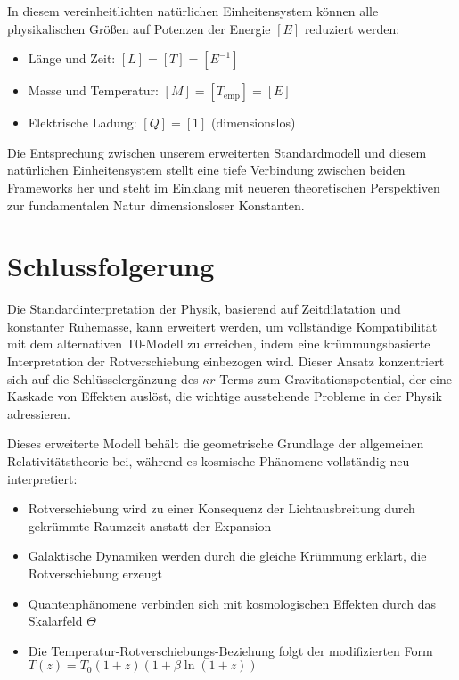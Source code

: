 \documentclass[12pt,a4paper]{article}
\begin{document}
	In diesem vereinheitlichten natürlichen Einheitensystem können alle physikalischen Größen auf Potenzen der Energie $[E]$ reduziert werden\cite{pascher_alpha_2025}:
	\begin{itemize}
		\item Länge und Zeit: $[L] = [T] = [E^{-1}]$
		\item Masse und Temperatur: $[M] = [T_{\text{emp}}] = [E]$
		\item Elektrische Ladung: $[Q] = [1]$ (dimensionslos)
	\end{itemize}
	
	Die Entsprechung zwischen unserem erweiterten Standardmodell und diesem natürlichen Einheitensystem stellt eine tiefe Verbindung zwischen beiden Frameworks her und steht im Einklang mit neueren theoretischen Perspektiven zur fundamentalen Natur dimensionsloser Konstanten\cite{duff2002}.
	
	\section{Schlussfolgerung}
	\label{sec:conclusion}
	
	Die Standardinterpretation der Physik, basierend auf Zeitdilatation und konstanter Ruhemasse, kann erweitert werden, um vollständige Kompatibilität mit dem alternativen T0-Modell zu erreichen, indem eine krümmungsbasierte Interpretation der Rotverschiebung einbezogen wird. Dieser Ansatz konzentriert sich auf die Schlüsselergänzung des $\kappa r$-Terms zum Gravitationspotential, der eine Kaskade von Effekten auslöst, die wichtige ausstehende Probleme in der Physik adressieren.
	
	Dieses erweiterte Modell behält die geometrische Grundlage der allgemeinen Relativitätstheorie\cite{einstein1915} bei, während es kosmische Phänomene vollständig neu interpretiert:
	\begin{itemize}
		\item Rotverschiebung wird zu einer Konsequenz der Lichtausbreitung durch gekrümmte Raumzeit anstatt der Expansion\cite{pascher_messdifferenzen_2025}
		\item Galaktische Dynamiken werden durch die gleiche Krümmung erklärt, die Rotverschiebung erzeugt\cite{pascher_galaxies_2025}
		\item Quantenphänomene verbinden sich mit kosmologischen Effekten durch das Skalarfeld $\Theta$\cite{pascher_lagrange_2025}
		\item Die Temperatur-Rotverschiebungs-Beziehung folgt der modifizierten Form $T(z) = T_0 (1+z)(1+\beta \ln(1+z))$\cite{pascher_temp_2025}
	\end{itemize}
	
\end{document}
